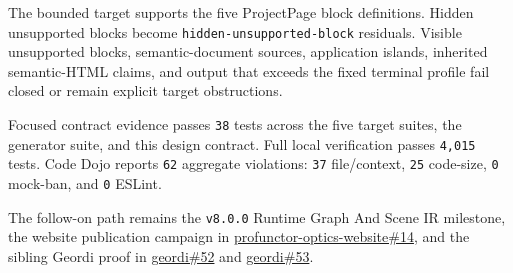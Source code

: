 The bounded target supports the five ProjectPage block definitions. Hidden unsupported blocks become \texttt{h\allowbreak{}i\allowbreak{}d\allowbreak{}d\allowbreak{}e\allowbreak{}n\allowbreak{}-\allowbreak{}u\allowbreak{}n\allowbreak{}s\allowbreak{}u\allowbreak{}p\allowbreak{}p\allowbreak{}o\allowbreak{}r\allowbreak{}t\allowbreak{}e\allowbreak{}d\allowbreak{}-\allowbreak{}b\allowbreak{}l\allowbreak{}o\allowbreak{}c\allowbreak{}k} residuals. Visible unsupported blocks, semantic-document sources, application islands, inherited semantic-HTML claims, and output that exceeds the fixed terminal profile fail closed or remain explicit target obstructions.

Focused contract evidence passes \texttt{3\allowbreak{}8} tests across the five target suites, the generator suite, and this design contract. Full local verification passes \texttt{4\allowbreak{},\allowbreak{}0\allowbreak{}1\allowbreak{}5} tests. Code Dojo reports \texttt{6\allowbreak{}2} aggregate violations: \texttt{3\allowbreak{}7} file/context, \texttt{2\allowbreak{}5} code-size, \texttt{0} mock-ban, and \texttt{0} ESLint.

The follow-on path remains the \texttt{v\allowbreak{}8\allowbreak{}.\allowbreak{}0\allowbreak{}.\allowbreak{}0} Runtime Graph And Scene IR milestone, the website publication campaign in \href{https://github.com/flyingrobots/profunctor-optics-website/issues/14}{profunctor-optics-website\#14}, and the sibling Geordi proof in \href{https://github.com/flyingrobots/geordi/issues/52}{geordi\#52} and \href{https://github.com/flyingrobots/geordi/pull/53}{geordi\#53}.

